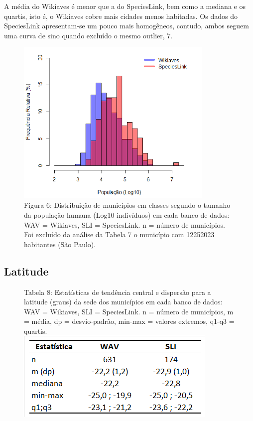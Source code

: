 \begin{resposta}
A média do Wikiaves é menor que a do SpeciesLink, bem como a mediana e os quartis, isto é, o Wikiaves cobre mais cidades menos habitadas. Os dados do SpeciesLink apresentam-se um pouco mais homogêneos, contudo, ambos seguem uma curva de sino quando excluído o mesmo outlier, 7.
\end{resposta}


\begin{figure}[h!]
\centering
\includegraphics[height = 8cm]{Imagens/H06.png}
\\{\scriptsize Figura 6: Distribuição de municípios em classes segundo o tamanho da população humana (Log10 indivíduos) em cada banco de dados: WAV = Wikiaves, SLI = SpeciesLink. n = número de municípios. Foi excluído da análise da Tabela 7 o município com 12252023 habitantes (São Paulo).}
\end{figure}

\newpage

\subsection{Latitude}

\begin{figure}[h!]
\centering
{\scriptsize Tabela 8: Estatísticas de tendência central e dispersão para a latitude (graus) da sede dos municípios em cada banco de dados: WAV = Wikiaves, SLI = SpeciesLink. n = número de municípios, m = média, dp = desvio-padrão, min-max = valores extremos, q1-q3 = quartis.}
\\
\includegraphics{Imagens/T08.png}
\end{figure}

